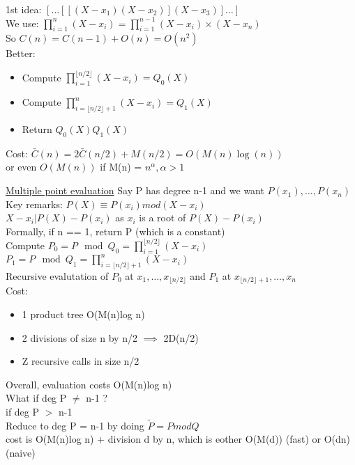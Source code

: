 \documentclass{article}
\theoremstyle{definition}
\theoremstyle{remark}
\begin{document}
1st idea: $[\dots[[(X-x_1)(X-x_2)](X-x_3)]\dots]$\\
We use: $\prod\limits_{i=1}^{n}(X-x_i) = \prod\limits_{i=1}^{n-1}(X-x_i) \times (X-x_n)$\\
So $C(n) = C(n-1) + O(n) = O(n^2)$\\

Better: \begin{itemize}
	\item Compute $\prod\limits_{i=1}^{\lfloor n/2 \rfloor}(X-x_i) = Q_0(X)$
	\item Compute $\prod\limits_{i=\lfloor n/2\rfloor+1}^{n}(X-x_i) = Q_1(X)$
	\item Return $Q_0(X)Q_1(X)$
\end{itemize}
Cost: $\bar{C}(n) = 2 \bar{C}(n/2) + M(n/2) = O(M(n)\log(n))$\\
or even $O(M(n))$ if M(n) = $n^\alpha, \alpha > 1$

\underline{Multiple point evaluation}
Say P has degree n-1 and we want $P(x_1),\dots,P(x_n)$\\

Key remarks: $P(X) \equiv P(x_i) mod (X-x_i)$\\
$X - x_i | P(X) - P(x_i)$ as $x_i$ is a root of $P(X) - P(x_i)$\\

Formally, if n == 1, return P (which is a constant)\\
Compute $P_0 = P \mod Q_0 = \prod\limits_{i=1}^{\lfloor n/2 \rfloor}(X-x_i)$\\
$P_1 = P \mod Q_1 = \prod\limits_{i=\lfloor n/2\rfloor+1}^{n}(X-x_i)$\\

Recursive evalutation of $P_0$ at $x_1,\dots,x_{\lfloor n/2\rfloor}$ and $P_1$ at $x_{\lfloor n/2\rfloor+1},\dots,x_n$\\

Cost: \begin{itemize}
	\item 1 product tree O(M(n)log n)
	\item 2 divisions of size n by n/2 $\implies$ 2D(n/2)
	\item Z recursive calls in size n/2
\end{itemize}
Overall, evaluation costs O(M(n)log n)\\

What if deg P $\neq$ n-1 ?\\
if deg P $>$ n-1\\
Reduce to deg P = n-1 by doing $\tilde{P} = P mod Q$\\
cost is O(M(n)log n) + division d by n, which is eother O(M(d)) (fast) or O(dn) (naive)\\
\end{document}
